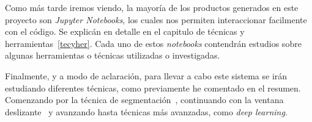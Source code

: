 Como más tarde iremos viendo, la mayoría de los productos generados en este proyecto son \textit{Jupyter Notebooks}, los cuales nos permiten interaccionar facilmente con el código. Se explicán en detalle en el capitulo de técnicas y herramientas~\ref{tecyher}. Cada uno de estos \textit{notebooks} contendrán estudios sobre algunas herramientas o técnicas utilizadas o investigadas.

Finalmente, y a modo de aclaración, para llevar a cabo este sistema se irán estudiando diferentes técnicas, como previamente he comentado en el resumen. Comenzando por la técnica de segmentación~\cite{wiki:segmentation}, continuando con la ventana deslizante~\cite{slidingwindow} y avanzando hasta técnicas más avanzadas, como \textit{deep learning}\cite{deeplearning}.